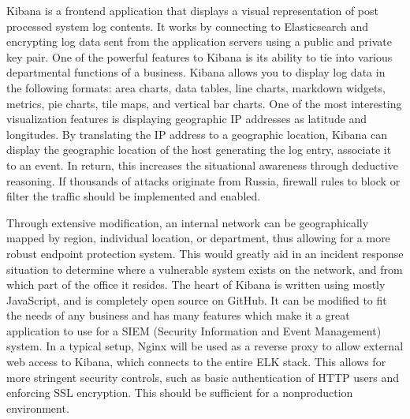 \documentclass[./main.tex]{subfiles}
\begin{document}
Kibana is a frontend application that displays a visual representation of post processed system log contents. It works by connecting to Elasticsearch and encrypting log data sent from the application servers using a public and private key pair. One of the powerful features to Kibana is its ability to tie into various departmental functions of a business. Kibana allows you to display log data in the following formats: area charts, data tables, line charts, markdown widgets, metrics, pie charts, tile maps, and vertical bar charts. One of the most interesting visualization features is displaying geographic IP addresses as latitude and longitudes. By translating the IP address to a geographic location, Kibana can display the geographic location of the host generating the log entry, associate it to an event. In return, this increases the situational awareness through deductive reasoning. If thousands of attacks originate from Russia, firewall rules to block or filter the traffic should be implemented and enabled.

Through extensive modification, an internal network can be geographically mapped by region, individual location, or department, thus allowing for a more robust endpoint protection system. This would greatly aid in an incident response situation to determine where a vulnerable system exists on the network, and from which part of the office it resides. The heart of Kibana is written using mostly JavaScript, and is completely open source on GitHub. It can be modified to fit the needs of any business and has many features which make it a great application to use for a SIEM (Security Information and Event Management) system. In a typical setup, Nginx will be used as a reverse proxy to allow external web access to Kibana, which connects to the entire ELK stack. This allows for more stringent security controls, such as basic authentication of HTTP users and enforcing SSL encryption. This should be sufficient for a non­production environment.
\end{document}
